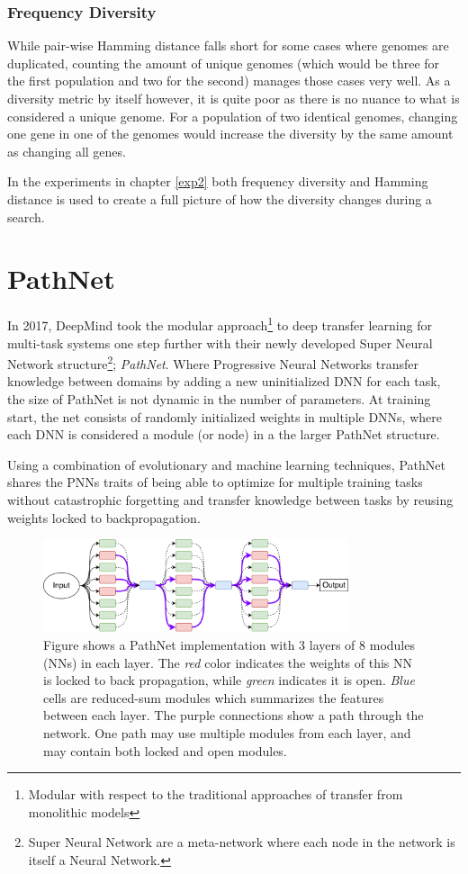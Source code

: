 \subsubsection{Frequency Diversity}
While pair-wise Hamming distance falls short for some cases where genomes are duplicated, counting the amount of unique genomes (which would be three for the first population and two for the second) manages those cases very well. As a diversity metric by itself however, it is quite poor as there is no nuance to what is considered a unique genome. For a population of two identical genomes, changing one gene in one of the genomes would increase the diversity by the same amount as changing all genes. 

In the experiments in chapter \ref{exp2} both frequency diversity and Hamming distance is used to create a full picture of how the diversity changes during a search.

\section{PathNet}
\label{background:pn}
In 2017, DeepMind took the modular approach\footnote{Modular with respect to the traditional approaches of transfer from monolithic models} to deep transfer learning for multi-task systems one step further with their newly developed Super Neural Network structure\footnote{Super Neural Network are a meta-network where each node in the network is itself a Neural Network.}; \textit{PathNet}\cite{pathnet}. Where Progressive Neural Networks transfer knowledge between domains by adding a new uninitialized DNN for each task, the size of PathNet is not dynamic in the number of parameters. At training start, the net consists of randomly initialized weights in multiple DNNs, where each DNN is considered a module (or node) in a the larger PathNet structure. 

Using a combination of evolutionary and machine learning techniques, PathNet shares the PNNs traits of being able to optimize for multiple training tasks without catastrophic forgetting and transfer knowledge between tasks by reusing weights locked to backpropagation.  
\begin{figure}[h]
    \centering
    \includegraphics[width=0.8\textwidth]{Chapters/2.Background/figures/PathNet.pdf}
    \caption{Figure shows a PathNet implementation with 3 layers of 8 modules (NNs) in each layer. The \textit{red} color indicates the weights of this NN is locked to back propagation, while \textit{green} indicates it is open. \textit{Blue} cells are reduced-sum modules which summarizes the features between each layer. The purple connections show a path through the network. One path may use multiple modules from each layer, and may contain both locked and open modules.}
    \label{fig:pathnet}
\end{figure}

